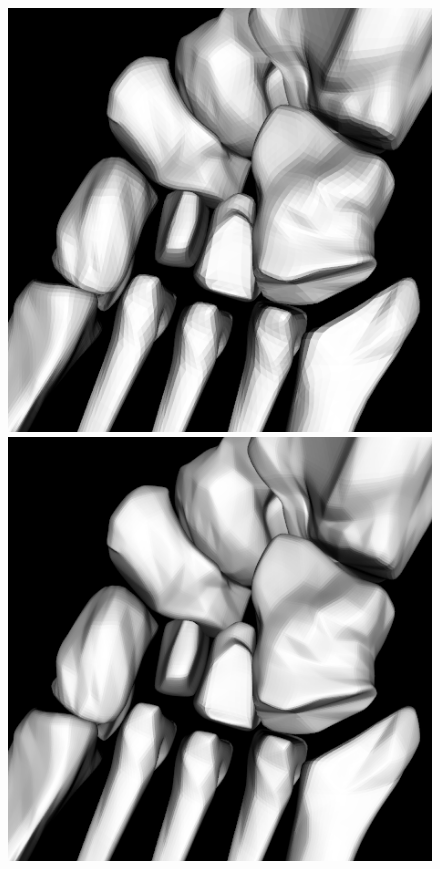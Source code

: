 \documentclass[10pt, conference, compsocconf]{IEEEtran}
\begin{document}
\begin{figure}[htbp]
{\begin{minipage}[h]{0.16\linewidth}
        \includegraphics[width=\textwidth]{./Figure/footbones/middle/combined2.png}\\
        \includegraphics[width=\textwidth]{./Figure/footbones/middle/combined3.png}\vspace{1ex}\\

\end{minipage}}
\end{figure}
\end{document}

